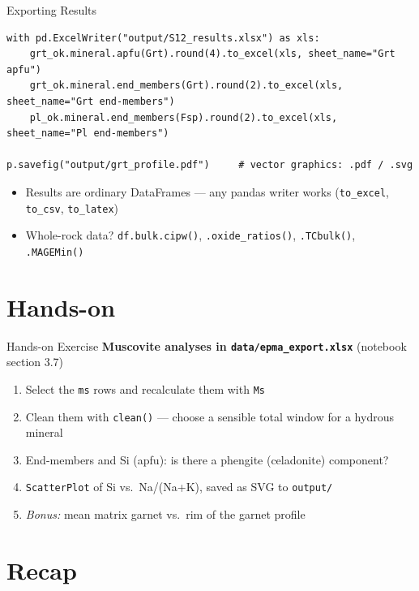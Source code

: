 \documentclass[aspectratio=169,11pt]{beamer}
\begin{document}
\begin{frame}[fragile]{Exporting Results}
  \begin{lstlisting}[style=python]
with pd.ExcelWriter("output/S12_results.xlsx") as xls:
    grt_ok.mineral.apfu(Grt).round(4).to_excel(xls, sheet_name="Grt apfu")
    grt_ok.mineral.end_members(Grt).round(2).to_excel(xls, sheet_name="Grt end-members")
    pl_ok.mineral.end_members(Fsp).round(2).to_excel(xls, sheet_name="Pl end-members")

p.savefig("output/grt_profile.pdf")     # vector graphics: .pdf / .svg
  \end{lstlisting}
  \vspace{0.2cm}
  \small
  \begin{itemize}
    \item Results are ordinary DataFrames --- any pandas writer works
          (\texttt{to\_excel}, \texttt{to\_csv}, \texttt{to\_latex})
    \item Whole-rock data? \texttt{df.bulk.cipw()}, \texttt{.oxide\_ratios()},
          \texttt{.TCbulk()}, \texttt{.MAGEMin()}
  \end{itemize}
\end{frame}

\section{Hands-on}

\begin{frame}{Hands-on Exercise}
  \textbf{Muscovite analyses in \texttt{data/epma\_export.xlsx}} (notebook section 3.7)
  \begin{enumerate}
    \item Select the \texttt{ms} rows and recalculate them with \texttt{Ms}
    \item Clean them with \texttt{clean()} --- choose a sensible total window
          for a hydrous mineral
    \item End-members and Si (apfu): is there a phengite (celadonite) component?
    \item \texttt{ScatterPlot} of Si vs.\ Na/(Na+K), saved as SVG to \texttt{output/}
    \item \emph{Bonus:} mean matrix garnet vs.\ rim of the garnet profile
  \end{enumerate}
\end{frame}

\section{Recap}
\end{document}
